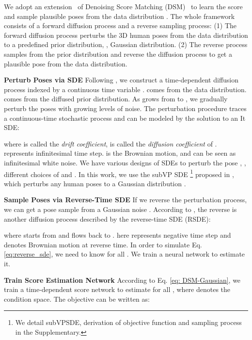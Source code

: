 \documentclass[10pt,twocolumn,letterpaper]{article}
\begin{document}
We adopt an extension~\cite{song2020score} of Denoising Score Matching (DSM)~\cite{denosingScoreMatching} to learn the score  and sample plausible poses from the data distribution . 
The whole framework consists of a forward diffusion process and a reverse sampling process:
(1) The forward diffusion process perturbs the 3D human poses from the data distribution to a predefined prior distribution, \eg, Gaussian distribution.
(2) The reverse process samples from the prior distribution and reverse the diffusion process to get a plausible pose from the data distribution. 


\noindent
\textbf{Perturb Poses via SDE}
Following \cite{song2020score}, we construct a time-dependent diffusion process  indexed by a continuous time variable .  comes from the data distribution.
  comes from the diffused prior distribution. As  grows from  to , we gradually perturb the poses with growing levels of noise. The perturbation procedure traces a continuous-time stochastic process and can be modeled by the solution to an It SDE:

where  is called the \textit{drift coefficient},  is called the \textit{diffusion coefficient} of .  represents infinitesimal time step.  is the Brownian motion, and  can be seen as infinitesimal white noise. We have various designs of SDEs to perturb the pose , \ie, different choices of  and . In this work, we use the subVP SDE 
\footnote{\label{footnote1}We detail subVPSDE, derivation of objective function and sampling process in the Supplementary.} 
proposed in \cite{song2020score}, which perturbs any human poses  to a Gaussian distribution . 



\noindent
\textbf{Sample Poses via Reverse-Time SDE}
If we reverse the perturbation process, we can get a pose sample  from a Gaussian noise . According to \cite{anderson1982reverse,song2020score}, the reverse is another diffusion process described by the reverse-time SDE (RSDE):

where  starts from  and flows back to .  here represents negative time step and  denotes Brownian motion at reverse time. In order to simulate Eq. \ref{eq:reverse_sde}, we need to know  for all . We train a neural network to estimate it.


\noindent
\textbf{Train Score Estimation Network}
According to Eq. \ref{eq: DSM-Gaussian}, we train a time-dependent score network  to estimate  for all , where  denotes the condition space. The objective can be written as:
\end{document}
